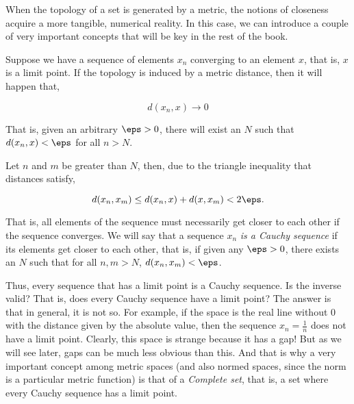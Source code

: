 When the topology of a set is generated by a metric, the notions of closeness acquire a more tangible, numerical reality. In this case, we can introduce a couple of very important concepts that will be key in the rest of the book.

Suppose we have a sequence of elements ${x_n}$ converging to an element $x$, that is, $x$ is a limit point. If the topology is induced by a metric distance, then it will happen that,

\begin{equation} 
    d(x_n, x) \to 0 
\end{equation}

That is, given an arbitrary $\eps > 0$, there will exist an $N$ such that $d(x_n, x) < \eps$ for all $n > N$.

Let $n$ and $m$ be greater than $N$, then, due to the triangle inequality that distances satisfy,

\begin{equation} 
    d(x_n, x_m) \leq d(x_n, x) + d(x, x_m) < 2\eps. 
\end{equation}

That is, all elements of the sequence must necessarily get closer to each other if the sequence converges. 
We will say that a sequence ${x_n}$ \textit{is a Cauchy sequence} if its elements get closer to each other, 
that is, if given any $\eps > 0$, there exists an $N$ such that for all $n, m > N$, $d(x_n, x_m) < \eps$.

Thus, every sequence that has a limit point is a Cauchy sequence. 
Is the inverse valid? That is, does every Cauchy sequence have a limit point? 
The answer is that in general, it is not so. 
For example, if the space is the real line without $0$ with the distance given by the absolute value, 
then the sequence ${x_n = \frac{1}{n}}$ does not have a limit point. 
Clearly, this space is strange because it has a gap! But as we will see later, 
gaps can be much less obvious than this. 
And that is why a very important concept among metric spaces (and also normed spaces, 
since the norm is a particular metric function) is that of a \textit{Complete set}, 
that is, a set where every Cauchy sequence has a limit point.


